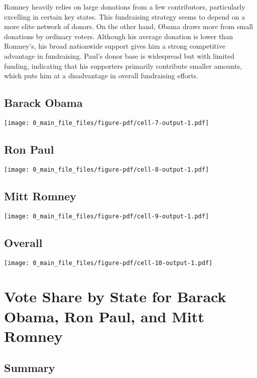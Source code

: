 \documentclass[
  letterpaper,
  DIV=11,
  numbers=noendperiod]{scrartcl}
\begin{document}
Romney heavily relies on large donations from a few contributors,
particularly excelling in certain key states. This fundraising strategy
seems to depend on a more elite network of donors. On the other hand,
Obama draws more from small donations by ordinary voters. Although his
average donation is lower than Romney's, his broad nationwide support
gives him a strong competitive advantage in fundraising. Paul's donor
base is widespread but with limited funding, indicating that his
supporters primarily contribute smaller amounts, which puts him at a
disadvantage in overall fundraising efforts.

\subsection{Barack Obama}\label{barack-obama-1}

\texttt{[image: 0\_main\_file\_files/figure-pdf/cell-7-output-1.pdf]}

\subsection{Ron Paul}\label{ron-paul-1}

\texttt{[image: 0\_main\_file\_files/figure-pdf/cell-8-output-1.pdf]}

\subsection{Mitt Romney}\label{mitt-romney-1}

\texttt{[image: 0\_main\_file\_files/figure-pdf/cell-9-output-1.pdf]}

\subsection{Overall}\label{overall}

\texttt{[image: 0\_main\_file\_files/figure-pdf/cell-10-output-1.pdf]}

\section{Vote Share by State for Barack Obama, Ron Paul, and Mitt
Romney}\label{vote-share-by-state-for-barack-obama-ron-paul-and-mitt-romney}

\subsection{Summary}\label{summary-3}
\end{document}
